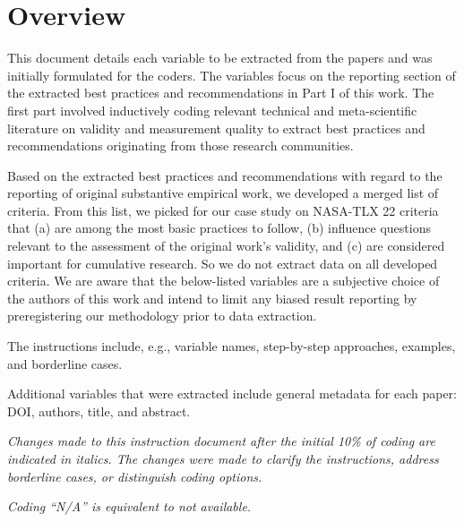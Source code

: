 \section{Overview}

This document details each variable to be extracted from the papers and was initially formulated for the coders. The variables focus on the reporting section of the extracted best practices and recommendations in Part I of this work. The first part involved inductively coding relevant technical and meta-scientific literature on validity and measurement quality to extract best practices and recommendations originating from those research communities. 

Based on the extracted best practices and recommendations with regard to the reporting of original substantive empirical work, we developed a merged list of criteria. From this list, we picked for our case study on NASA-TLX 22 criteria that (a) are among the most basic practices to follow, (b) influence questions relevant to the assessment of the original work’s validity, and (c) are considered important for cumulative research. So we do not extract data on all developed criteria. We are aware that the below-listed variables are a subjective choice of the authors of this work and intend to limit any biased result reporting by preregistering our methodology prior to data extraction.

The instructions include, e.g., variable names, step-by-step approaches, examples, and borderline cases.

Additional variables that were extracted include general metadata for each paper: DOI, authors, title, and abstract.

\textit{Changes made to this instruction document after the initial 10\% of coding are indicated in italics. The changes were made to clarify the instructions, address borderline cases, or distinguish coding options.}

\textit{Coding ``N/A'' is equivalent to not available.}



